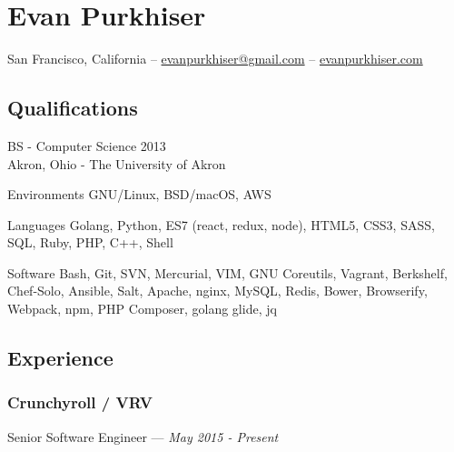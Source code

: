 \documentclass[letterpaper,10pt]{article}
\begin{document}
\section{Evan Purkhiser}

\hfill San Francisco, California --
\href{mailto:evanpurkhiser@gmail.com}{evanpurkhiser@gmail.com} --
\href{https://evanpurkhiser.com}{evanpurkhiser.com}

\subsection{Qualifications}

BS - Computer Science 2013\\
Akron, Ohio - The University of Akron

\begin{skills}
\item[Environments]
  GNU/Linux, BSD/macOS, AWS
\item[Languages]
  Golang, Python, ES7 (react, redux, node), HTML5, CSS3, SASS, SQL,
  Ruby, PHP, C++, Shell
\item[Software]
  Bash, Git, SVN, Mercurial, VIM, GNU Coreutils, Vagrant, Berkshelf,
  Chef-Solo, Ansible, Salt, Apache, nginx, MySQL, Redis, Bower, Browserify,
  Webpack, npm, PHP Composer, golang glide, jq
\end{skills}

\subsection{Experience}

\subsubsection{Crunchyroll / VRV}
\hfill Senior Software Engineer --- \emph{May 2015 - Present}
\end{document}
